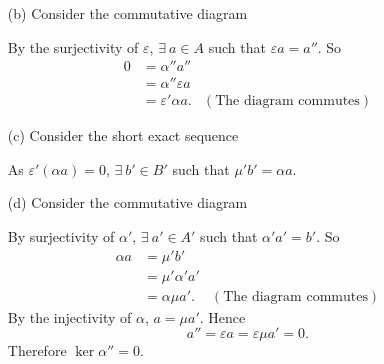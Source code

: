 \documentclass{article}
\begin{document}
\begin{enumerate}
\begin{enumerate}
  \item[(b)]
    Consider the commutative diagram
    \begin{center}
    \end{center}
    By the surjectivity of $\varepsilon$,
    $\exists \: a \in A$ such that $\varepsilon a = a''$.
    So
    \begin{align*}
      0
      &= \alpha'' a'' \\
      &= \alpha'' \varepsilon a \\
      &= \varepsilon' \alpha a.
        &(\text{The diagram commutes})
    \end{align*}

  \item[(c)]
    Consider the short exact sequence
    \begin{center}
    \end{center}
    As $\varepsilon'(\alpha a) = 0$,
    $\exists \: b' \in B'$ such that $\mu' b' = \alpha a$.

  \item[(d)]
    Consider the commutative diagram
    \begin{center}
    \end{center}
    By surjectivity of $\alpha'$,
    $\exists \: a' \in A'$ such that $\alpha' a' = b'$.
    So
    \begin{align*}
      \alpha a
      &= \mu' b' \\
      &= \mu' \alpha' a' \\
      &= \alpha \mu a'.
        &(\text{The diagram commutes})
    \end{align*}
    By the injectivity of $\alpha$, $a = \mu a'$.
    Hence
    \[
      a''
      = \varepsilon a
      = \varepsilon\mu a'
      = 0.
    \]
    Therefore $\ker\alpha'' = 0$.
  \end{enumerate}


\end{enumerate}
\end{document}
